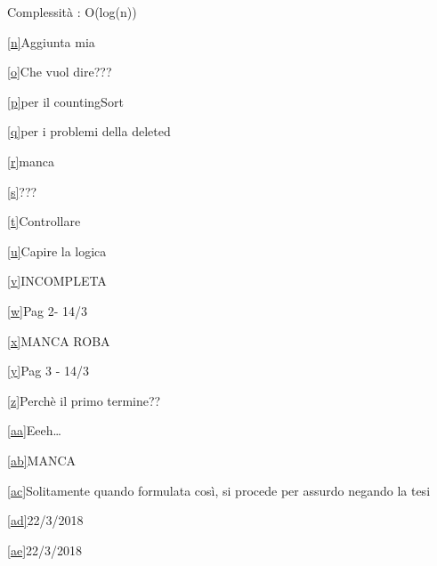 \documentclass{article}
\begin{document}
{Complessità : O(log(n))}

\protect\hyperlink{cmnt_ref14}{{[}n{]}}{Aggiunta mia}

\protect\hyperlink{cmnt_ref15}{{[}o{]}}{Che vuol dire???}

\protect\hyperlink{cmnt_ref16}{{[}p{]}}{per il countingSort}

\protect\hyperlink{cmnt_ref17}{{[}q{]}}{per i problemi della deleted}

\protect\hyperlink{cmnt_ref18}{{[}r{]}}{manca}

\protect\hyperlink{cmnt_ref19}{{[}s{]}}{???}

\protect\hyperlink{cmnt_ref20}{{[}t{]}}{Controllare}

\protect\hyperlink{cmnt_ref21}{{[}u{]}}{Capire la logica}

\protect\hyperlink{cmnt_ref22}{{[}v{]}}{INCOMPLETA}

\protect\hyperlink{cmnt_ref23}{{[}w{]}}{Pag 2- 14/3}

\protect\hyperlink{cmnt_ref24}{{[}x{]}}{MANCA ROBA}

\protect\hyperlink{cmnt_ref25}{{[}y{]}}{Pag 3 - 14/3}

\protect\hyperlink{cmnt_ref26}{{[}z{]}}{Perchè il primo termine??}

\protect\hyperlink{cmnt_ref27}{{[}aa{]}}{Eeeh\ldots{}}

\protect\hyperlink{cmnt_ref28}{{[}ab{]}}{MANCA}

\protect\hyperlink{cmnt_ref29}{{[}ac{]}}{Solitamente quando formulata
così, si procede per assurdo negando la tesi}

\protect\hyperlink{cmnt_ref30}{{[}ad{]}}{22/3/2018}

\protect\hyperlink{cmnt_ref31}{{[}ae{]}}{22/3/2018}
\end{document}
